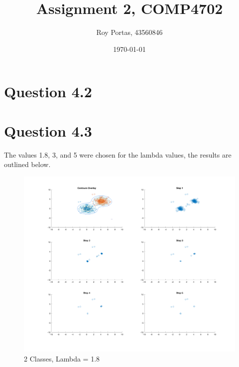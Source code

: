 

\title{Assignment 2, COMP4702}
\author{Roy Portas, 43560846}
\date{\today}



\begin{titlepage}
    \maketitle
\end{titlepage}

\section*{Question 4.2}



\section*{Question 4.3}

The values 1.8, 3, and 5 were chosen for the lambda values, the results are outlined below.

\begin{figure}[H]
    \includegraphics[width=\linewidth]{../../pracs/week5/images/q3_2class_1_8}
    \centering
    \caption{2 Classes, Lambda = 1.8}
\end{figure}

